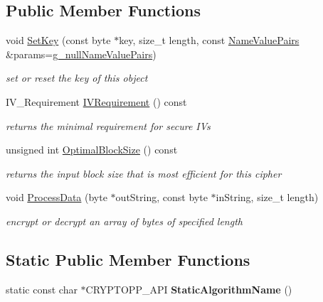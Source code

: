 \subsection*{Public Member Functions}
\begin{DoxyCompactItemize}
\item 
void \hyperlink{class_e_c_b___one_way_aea389c964114b73390dd81d836124461}{SetKey} (const byte $\ast$key, size\_\-t length, const \hyperlink{class_name_value_pairs}{NameValuePairs} \&params=\hyperlink{cryptlib_8h_ab1b0f7d11a21c6163be8ca2662ce2ac6}{g\_\-nullNameValuePairs})
\begin{DoxyCompactList}\small\item\em set or reset the key of this object \item\end{DoxyCompactList}\item 
\hypertarget{class_e_c_b___one_way_af8a68508189a975f873d27d9f070171d}{
IV\_\-Requirement \hyperlink{class_e_c_b___one_way_af8a68508189a975f873d27d9f070171d}{IVRequirement} () const }
\label{class_e_c_b___one_way_af8a68508189a975f873d27d9f070171d}

\begin{DoxyCompactList}\small\item\em returns the minimal requirement for secure IVs \item\end{DoxyCompactList}\item 
unsigned int \hyperlink{class_e_c_b___one_way_ae525b1874f11cd0aa85f2d93c17f9d08}{OptimalBlockSize} () const 
\begin{DoxyCompactList}\small\item\em returns the input block size that is most efficient for this cipher \item\end{DoxyCompactList}\item 
void \hyperlink{class_e_c_b___one_way_a4d8c291d821d86f7f4caa3cf95d1834c}{ProcessData} (byte $\ast$outString, const byte $\ast$inString, size\_\-t length)
\begin{DoxyCompactList}\small\item\em encrypt or decrypt an array of bytes of specified length \item\end{DoxyCompactList}\end{DoxyCompactItemize}
\subsection*{Static Public Member Functions}
\begin{DoxyCompactItemize}
\item 
\hypertarget{class_e_c_b___one_way_a954dccf1780d6a355b080e0652b9bb55}{
static const char $\ast$CRYPTOPP\_\-API {\bfseries StaticAlgorithmName} ()}
\label{class_e_c_b___one_way_a954dccf1780d6a355b080e0652b9bb55}

\end{DoxyCompactItemize}


